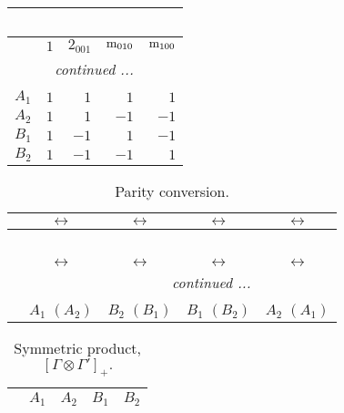 \documentclass[fleqn,10pt,landscape]{article}
\begin{document}
\begin{itemize}
\begin{center}
\begin{longtable}{c|rrrr}
\multicolumn{4}{l}{\tablename\ \thetable{}} \\
 \hline \hline
 & $ 1 $ & $ 2{}_{001} $ & $ {\rm m}_{010} $ & $ {\rm m}_{100} $ \\ \hline \endhead

 \hline \hline
\multicolumn{4}{r}{\footnotesize\it continued ...} \\ \endfoot

 \hline \hline
\multicolumn{4}{r}{} \\ \endlastfoot

$ A_{1} $ & $ 1 $ & $ 1 $ & $ 1 $ & $ 1 $ \\
$ A_{2} $ & $ 1 $ & $ 1 $ & $ -1 $ & $ -1 $ \\
$ B_{1} $ & $ 1 $ & $ -1 $ & $ 1 $ & $ -1 $ \\
$ B_{2} $ & $ 1 $ & $ -1 $ & $ -1 $ & $ 1 $ \\
\end{longtable}
\end{center}
\begin{center}
\renewcommand{\arraystretch}{1.0}
\begin{longtable}{ccccc}
\caption{Parity conversion.}
 \\
 \hline \hline
 & $\leftrightarrow$ & $\leftrightarrow$ & $\leftrightarrow$ & $\leftrightarrow$ \\ \hline \endfirsthead

\multicolumn{4}{l}{\tablename\ \thetable{}} \\
 \hline \hline
 & $\leftrightarrow$ & $\leftrightarrow$ & $\leftrightarrow$ & $\leftrightarrow$ \\ \hline \endhead

 \hline \hline
\multicolumn{4}{r}{\footnotesize\it continued ...} \\ \endfoot

 \hline \hline
\multicolumn{4}{r}{} \\ \endlastfoot

 & $ A_{1}\,\,(A_{2}) $ & $ B_{2}\,\,(B_{1}) $ & $ B_{1}\,\,(B_{2}) $ & $ A_{2}\,\,(A_{1}) $ \\
\end{longtable}
\end{center}
\begin{center}
\renewcommand{\arraystretch}{1.0}
\begin{longtable}{c|cccc}
\caption{Symmetric product, $[\Gamma\otimes\Gamma']_+.$}
 \\
 \hline \hline
 & $ A_{1} $ & $ A_{2} $ & $ B_{1} $ & $ B_{2} $ \\ \hline \endfirsthead


\end{longtable}
\end{center}
\end{itemize}
\end{document}
